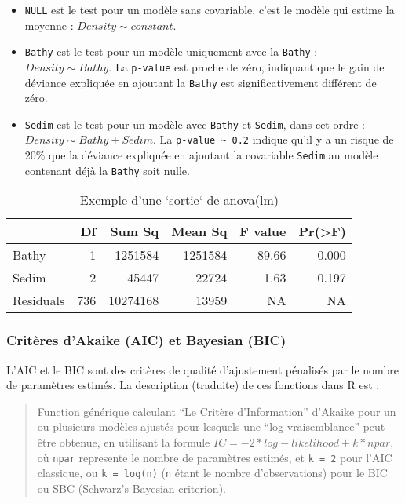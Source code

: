 \documentclass[french,a4paper]{article}
\providecommand{\tightlist}{%
  \setlength{\itemsep}{0pt}\setlength{\parskip}{0pt}}
\begin{document}
\begin{itemize}
\tightlist
\item
  \texttt{NULL} est le test pour un modèle sans covariable, c'est le modèle qui estime la moyenne : \(Density \sim constant\).
\item
  \texttt{Bathy} est le test pour un modèle uniquement avec la \texttt{Bathy} : \(Density \sim Bathy\). La \texttt{p-value} est proche de zéro, indiquant que le gain de déviance expliquée en ajoutant la \texttt{Bathy} est significativement différent de zéro.
\item
  \texttt{Sedim} est le test pour un modèle avec \texttt{Bathy} et \texttt{Sedim}, dans cet ordre : \(Density \sim Bathy + Sedim\). La \texttt{p-value\ \textasciitilde{}\ 0.2} indique qu'il y a un risque de 20\% que la déviance expliquée en ajoutant la covariable \texttt{Sedim} au modèle contenant déjà la \texttt{Bathy} soit nulle.
\end{itemize}

\begin{table}[t]

\caption{\label{tab:RTableAnova}Exemple d'une `sortie` de anova(lm)}
\centering
\begin{tabular}{l|r|r|r|r|r}
\hline
  & Df & Sum Sq & Mean Sq & F value & Pr(>F)\\
\hline
Bathy & 1 & 1251584 & 1251584 & 89.66 & 0.000\\
\hline
Sedim & 2 & 45447 & 22724 & 1.63 & 0.197\\
\hline
Residuals & 736 & 10274168 & 13959 & NA & NA\\
\hline
\end{tabular}
\end{table}

\hypertarget{criteres-dakaike-aic-et-bayesian-bic}{%
\subsubsection{Critères d'Akaike (AIC) et Bayesian (BIC)}\label{criteres-dakaike-aic-et-bayesian-bic}}

L'AIC et le BIC sont des critères de qualité d'ajustement pénalisés par le nombre de paramètres estimés. La description (traduite) de ces fonctions dans R est :

\begin{quote}
Function générique calculant ``Le Critère d'Information'' d'Akaike pour un ou plusieurs modèles ajustés pour lesquels une ``log-vraisemblance'' peut être obtenue, en utilisant la formule \(IC = -2*log-likelihood + k*npar\), où \texttt{npar} represente le nombre de paramètres estimés, et \texttt{k\ =\ 2} pour l'AIC classique, ou \texttt{k\ =\ log(n)} (\texttt{n} étant le nombre d'observations) pour le BIC ou SBC (Schwarz's Bayesian criterion).
\end{quote}
\end{document}
